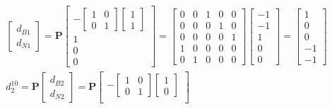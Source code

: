 \documentclass[11pt]{article}
\begin{document}
\begin{enumerate}
\begin{align*}
\begin{bmatrix}
         d_{B1} \\ d_{N1}
      \end{bmatrix}
      =
      \textbf{P}
      \begin{bmatrix}
        -
        \begin{bmatrix}
         1 & 0 \\ 0 & 1   
        \end{bmatrix}
        \begin{bmatrix}
            1 \\ 1
        \end{bmatrix} \\
        1 \\ 0 \\ 0
      \end{bmatrix}
      = 
      \begin{bmatrix}
        0 & 0 & 1 & 0 & 0 \\
        0 & 0 & 0 & 1 & 0 \\
        0 & 0 & 0 & 0 & 1 \\
        1 & 0 & 0 & 0 & 0 \\
        0 & 1 & 0 & 0 & 0
      \end{bmatrix}
      \begin{bmatrix}
        -1 \\ -1 \\ 1 \\ 0 \\ 0
      \end{bmatrix}
      =
      \begin{bmatrix}
        1 \\ 0 \\ 0 \\ -1 \\ -1
      \end{bmatrix}
      \\
      d_2^{10} = \textbf{P}
      \begin{bmatrix}
         d_{B2} \\ d_{N2}
      \end{bmatrix}
      =
      \textbf{P}
      \begin{bmatrix}
        -
        \begin{bmatrix}
         1 & 0 \\ 0 & 1   
        \end{bmatrix}
        \begin{bmatrix}
            1 \\ 0
        \end{bmatrix} \\

\end{bmatrix}
\end{align*}
\end{enumerate}
\end{document}
